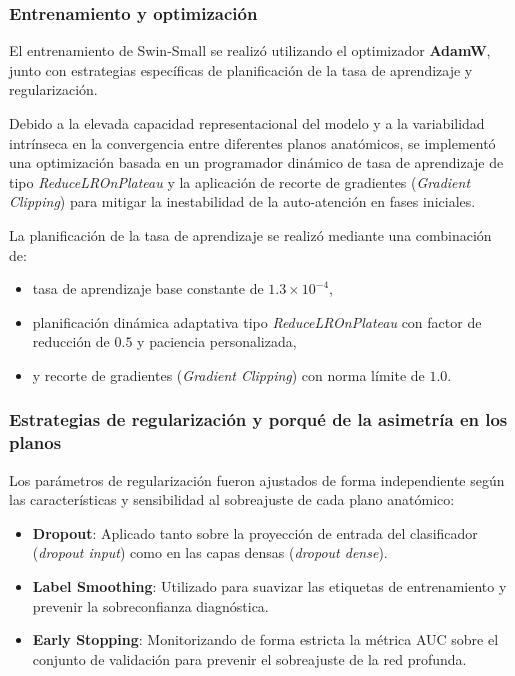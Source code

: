 \subsubsection{Entrenamiento y optimización}

El entrenamiento de Swin-Small se realizó utilizando el optimizador \textbf{AdamW}, junto con estrategias específicas de planificación de la tasa de aprendizaje y regularización.

Debido a la elevada capacidad representacional del modelo y a la variabilidad intrínseca en la convergencia entre diferentes planos anatómicos, se implementó una optimización basada en un programador dinámico de tasa de aprendizaje de tipo \textit{ReduceLROnPlateau} y la aplicación de recorte de gradientes (\textit{Gradient Clipping}) para mitigar la inestabilidad de la auto-atención en fases iniciales.

La planificación de la tasa de aprendizaje se realizó mediante una combinación de:
\begin{itemize}
    \item tasa de aprendizaje base constante de $1.3 \times 10^{-4}$,
    \item planificación dinámica adaptativa tipo \textit{ReduceLROnPlateau} con factor de reducción de $0.5$ y paciencia personalizada,
    \item y recorte de gradientes (\textit{Gradient Clipping}) con norma límite de $1.0$.
\end{itemize}

\subsubsection{Estrategias de regularización y porqué de la asimetría en los planos}

Los parámetros de regularización fueron ajustados de forma independiente según las características y sensibilidad al sobreajuste de cada plano anatómico:

\begin{itemize}
    \item \textbf{Dropout}: Aplicado tanto sobre la proyección de entrada del clasificador (\textit{dropout input}) como en las capas densas (\textit{dropout dense}).
    
    \item \textbf{Label Smoothing}: Utilizado para suavizar las etiquetas de entrenamiento y prevenir la sobreconfianza diagnóstica.
    
    \item \textbf{Early Stopping}: Monitorizando de forma estricta la métrica AUC sobre el conjunto de validación para prevenir el sobreajuste de la red profunda.
\end{itemize}

